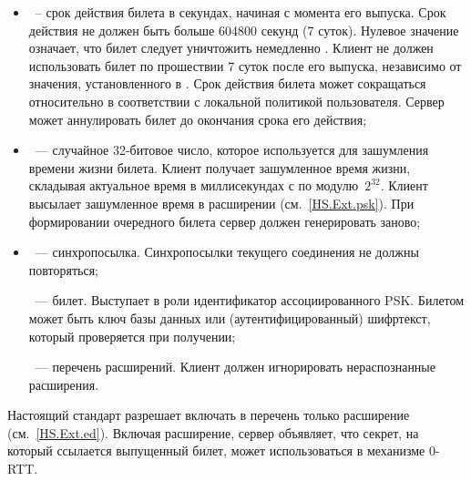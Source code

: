 \begin{itemize}
\item
{}~-- срок действия билета в секундах, начиная с момента 
его выпуска.
%
%
Срок действия не должен быть больше 604800 секунд (7 суток). Нулевое значение
 означает, что билет следует уничтожить немедленно 
.
% 
Клиент не должен использовать билет по прошествии 7 суток после его выпуска,
независимо от значения, установленного в .
%
Срок действия билета может сокращаться относительно 
в соответствии с локальной политикой пользователя.
%
Сервер может аннулировать билет до окончания срока его действия; 


\item
{}~--- случайное 32-битовое число, которое используется для 
зашумления времени жизни билета. Клиент получает зашумленное время жизни, 
складывая актуальное время в миллисекундах с  по 
модулю~$2^{32}$. Клиент высылает зашумленное время в расширении 
 (см.~\ref{HS.Ext.psk}). При формировании  
очередного билета сервер должен генерировать  заново;

\item
{}~--- синхропосылка. Синхропосылки текущего соединения не 
должны повторяться;

~--- билет. Выступает в роли идентификатор ассоциированного PSK. 
Билетом может быть ключ базы данных или (аутентифицированный) шифртекст, 
который проверяется при получении;


~--- перечень расширений. Клиент должен игнорировать 
нераспознанные расширения.
\end{itemize}

Настоящий стандарт разрешает включать в перечень
 только расширение  
(см.~\ref{HS.Ext.ed}). Включая расширение, сервер объявляет, что секрет, на
который ссылается выпущенный билет, может использоваться в механизме
\mbox{0-RTT}.

